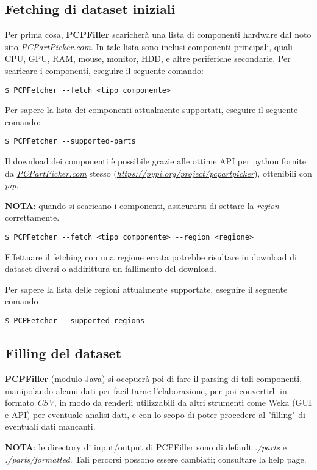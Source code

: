 \documentclass[12pt]{report}
\begin{document}
\newpage
\subsection{Fetching di dataset iniziali}

Per prima cosa, \textbf{PCPFiller} scaricherà una lista di componenti hardware dal noto sito
\underline{\textit{PCPartPicker.com}.} In tale lista sono inclusi componenti principali, quali
CPU, GPU, RAM, mouse, monitor, HDD, e altre periferiche secondarie.
Per scaricare i componenti, eseguire il seguente comando:
\begin{verbatim}$ PCPFetcher --fetch <tipo componente>\end{verbatim}
Per sapere la lista dei componenti attualmente supportati, eseguire il seguente comando:
\begin{verbatim}$ PCPFetcher --supported-parts\end{verbatim}
Il download dei componenti è possibile grazie alle ottime API per python fornite da
\underline{\textit{PCPartPicker.com}} stesso (\underline{\textit{https://pypi.org/project/pcpartpicker}}),
ottenibili con \textit{pip}.

\textbf{NOTA}: quando si scaricano i componenti, assicurarsi di settare la \textit{region} correttamente.
\begin{verbatim}$ PCPFetcher --fetch <tipo componente> --region <regione>\end{verbatim}
Effettuare il fetching con una regione errata potrebbe risultare in download di dataset diversi
o addirittura un fallimento del download.

Per sapere la lista delle regioni attualmente supportate, eseguire il seguente comando
\begin{verbatim}$ PCPFetcher --supported-regions\end{verbatim}

\newpage
\subsection{Filling del dataset}

\textbf{PCPFiller} (modulo Java) si occpuerà poi di fare il parsing di tali componenti, manipolando
alcuni dati per facilitarne l'elaborazione, per poi convertirli in formato \textit{CSV}, in modo da
renderli utilizzabili da altri strumenti come Weka (GUI e API) per eventuale analisi dati, e con lo
scopo di poter procedere al "filling" di eventuali dati mancanti.

\textbf{NOTA}: le directory di input/output di PCPFiller sono di default \textit{./parts} e
\textit{./parts/formatted}. Tali percorsi possono essere cambiati; consultare la help page.
\end{document}

